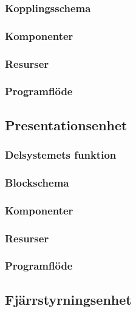 \documentclass{article}
\begin{document}
\subsubsection{Kopplingsschema}

\subsubsection{Komponenter}

\subsubsection{Resurser}

\subsubsection{Programflöde}

\clearpage

\subsection{Presentationsenhet}

\subsubsection{Delsystemets funktion}

\subsubsection{Blockschema}

\subsubsection{Komponenter}

\subsubsection{Resurser}

\subsubsection{Programflöde}

\clearpage

\subsection{Fjärrstyrningsenhet}
\end{document}
